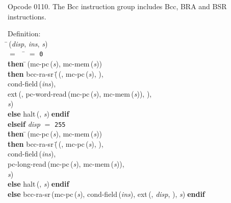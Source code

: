  Opcode 0110.
 The Bcc instruction group includes Bcc, BRA and BSR instructions.
\begin{tabbing}{\sc Definition}: \\  
\=\,({\it{disp\/}}, {\it{ins\/}}, {\it{s\/}}) \\ 
$=$$\;\;\;\;$\= $=$ {\tt{0}} \\ 
{\bf then }\=\,({\rm{mc-pc}}\,({\it{s\/}}), {\rm{mc-mem}}\,({\it{s\/}})) \\ 
{\bf then }{\rm{bcc-ra-sr}}\,(\=\,({}, {\rm{mc-pc}}\,({\it{s\/}}), {}), \\ 
{\rm{cond-field}}\,({\it{ins\/}}), \\ 
{\rm{ext}}\,({}, {\rm{pc-word-read}}\,({\rm{mc-pc}}\,({\it{s\/}}), {\rm{mc-mem}}\,({\it{s\/}})), {}), \\ 
{\it{s\/}})\- \\ 
{\bf else }{\rm{halt}}\,({}, {\it{s\/}})$\;${\bf  endif}\- \\ 
{\bf elseif }{\it{disp\/}} $=$ {\tt{255}} \\ 
{\bf then }\=\,({\rm{mc-pc}}\,({\it{s\/}}), {\rm{mc-mem}}\,({\it{s\/}})) \\ 
{\bf then }{\rm{bcc-ra-sr}}\,(\=\,({}, {\rm{mc-pc}}\,({\it{s\/}}), {}), \\ 
{\rm{cond-field}}\,({\it{ins\/}}), \\ 
{\rm{pc-long-read}}\,({\rm{mc-pc}}\,({\it{s\/}}), {\rm{mc-mem}}\,({\it{s\/}})), \\ 
{\it{s\/}})\- \\ 
{\bf else }{\rm{halt}}\,({}, {\it{s\/}})$\;${\bf  endif}\- \\ 
{\bf else }{\rm{bcc-ra-sr}}\,({\rm{mc-pc}}\,({\it{s\/}}), {\rm{cond-field}}\,({\it{ins\/}}), {\rm{ext}}\,({}, {\it{disp\/}}, {}), {\it{s\/}})$\;${\bf  endif}\-\-
\end{tabbing}

